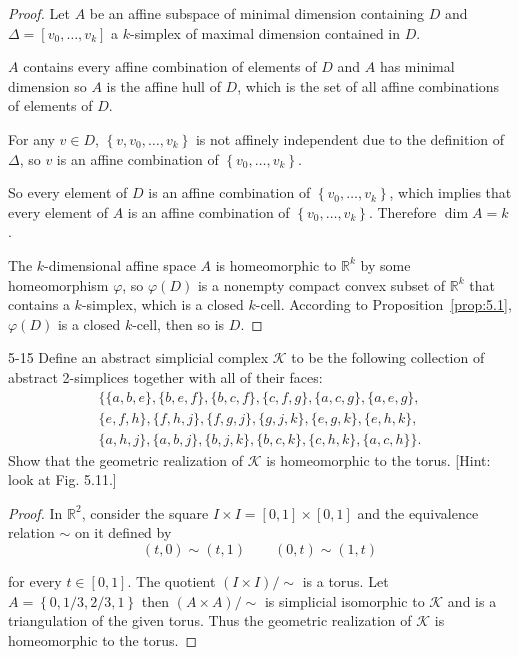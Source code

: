 \begin{proof}
	Let \( A \) be an affine subspace of minimal dimension containing \( D \) and \( \Delta = [v_{0}, \ldots, v_{k}] \) a \( k \)-simplex of maximal dimension contained in \( D \).

	\( A \) contains every affine combination of elements of \( D \) and \( A \) has minimal dimension so \( A \) is the affine hull of \( D \), which is the set of all affine combinations of elements of \( D \).

	For any \( v \in D \), \( \left\{ v, v_{0}, \ldots, v_{k} \right\} \) is not affinely independent due to the definition of \( \Delta \), so \( v \) is an affine combination of \( \left\{ v_{0}, \ldots, v_{k} \right\} \).

	So every element of \( D \) is an affine combination of \( \left\{ v_{0}, \ldots, v_{k} \right\} \), which implies that every element of \( A \) is an affine combination of \( \left\{ v_{0}, \ldots, v_{k} \right\} \). Therefore \( \dim A = k \).

	The \( k \)-dimensional affine space \( A \) is homeomorphic to \( \mathbb{R}^{k} \) by some homeomorphism \( \varphi \), so \( \varphi(D) \) is a nonempty compact convex subset of \( \mathbb{R}^{k} \) that contains a \( k \)-simplex, which is a closed \( k \)-cell. According to Proposition~\ref{prop:5.1}, \( \varphi(D) \) is a closed \( k \)-cell, then so is \( D \).
\end{proof}

\begin{problem}{5-15}\label{problem:5-15}
Define an abstract simplicial complex \( \mathcal{K} \) to be the following collection of abstract 2-simplices together with all of their faces:
\begin{multline*}
	\{ \{a, b, e\}, \{b, e, f\}, \{b, c, f\}, \{c, f, g\}, \{a, c, g\}, \{a, e, g\}, \\
	\{e, f, h\}, \{f, h, j\}, \{f, g, j\}, \{g, j, k\}, \{e, g, k\}, \{e, h, k\}, \\
	\{a, h, j\}, \{a, b, j\}, \{b, j, k\}, \{b, c, k\}, \{c, h, k\}, \{a, c, h\} \}.
\end{multline*}
Show that the geometric realization of \( \mathcal{K} \) is homeomorphic to the torus. [Hint: look at Fig. 5.11.]
\end{problem}

\begin{proof}
	In \( \mathbb{R}^{2} \), consider the square \( I \times I = [0, 1] \times [0, 1] \) and the equivalence relation \( \sim \) on it defined by
	\[
		(t, 0) \sim (t, 1) \qquad (0, t) \sim (1, t)
	\]

	for every \( t \in [0, 1] \). The quotient \( (I \times I)/\sim \) is a torus. Let \( A = \left\{ 0, 1/3, 2/3, 1 \right\} \) then \( (A\times A)/\sim \) is simplicial isomorphic to \( \mathcal{K} \) and is a triangulation of the given torus. Thus the geometric realization of \( \mathcal{K} \) is homeomorphic to the torus.
\end{proof}

